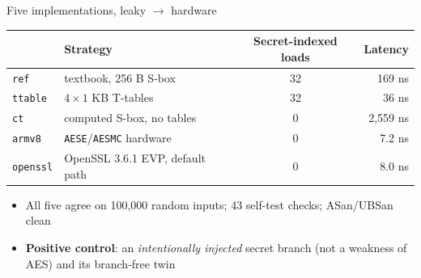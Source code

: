 \documentclass[aspectratio=169,11pt]{beamer}
\newcommand{\code}[1]{\texttt{#1}}
\begin{document}
\begin{frame}{Five implementations, leaky $\rightarrow$ hardware}
\centering\small
\renewcommand{\arraystretch}{1.15}
\begin{tabular}{@{}llcr@{}}
\toprule
& Strategy & Secret-indexed loads & Latency \\
\midrule
\code{ref} & textbook, 256 B S-box & 32 & 169 ns \\
\code{ttable} & $4\times1$ KB T-tables & 32 & 36 ns \\
\code{ct} & computed S-box, no tables & \alert{0} & 2,559 ns \\
\code{armv8} & \code{AESE}/\code{AESMC} hardware & \alert{0} & \alert{7.2 ns} \\
\code{openssl} & OpenSSL 3.6.1 EVP, default path & 0 & 8.0 ns \\
\bottomrule
\end{tabular}

\vspace{0.4cm}
\raggedright
\begin{itemize}
  \item All five agree on \alert{100,000 random inputs}; 43 self-test checks; ASan/UBSan clean
  \item \textbf{Positive control}: an \emph{intentionally injected} secret branch (not a weakness of AES) and its branch-free twin
\end{itemize}
\end{frame}
\end{document}
